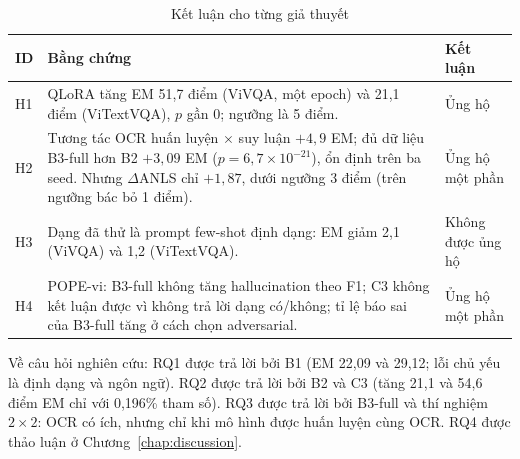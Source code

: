 \begin{table}[htbp]
\caption{Kết luận cho từng giả thuyết}
\label{tab:res-hyp}
\centering
\small
\begin{tabular}{p{}p{}p{}}
\toprule
\raggedright \textbf{ID} & \raggedright \textbf{Bằng chứng} & \raggedright \textbf{Kết luận} \tabularnewline
\midrule
\raggedright H1 & \raggedright QLoRA tăng EM 51,7 điểm (ViVQA, một epoch) và 21,1 điểm (ViTextVQA), $p$ gần 0; ngưỡng là 5 điểm. & \raggedright Ủng hộ \tabularnewline
\raggedright H2 & \raggedright Tương tác OCR huấn luyện $\times$ suy luận $+4{,}9$ EM; đủ dữ liệu B3-full hơn B2 $+3{,}09$ EM ($p = 6{,}7\times10^{-21}$), ổn định trên ba seed. Nhưng $\Delta$ANLS chỉ $+1{,}87$, dưới ngưỡng 3 điểm (trên ngưỡng bác bỏ 1 điểm). & \raggedright Ủng hộ một phần \tabularnewline
\raggedright H3 & \raggedright Dạng đã thử là prompt few-shot định dạng: EM giảm 2,1 (ViVQA) và 1,2 (ViTextVQA). & \raggedright Không được ủng hộ \tabularnewline
\raggedright H4 & \raggedright POPE-vi: B3-full không tăng hallucination theo F1; C3 không kết luận được vì không trả lời dạng có/không; tỉ lệ báo sai của B3-full tăng ở cách chọn adversarial. & \raggedright Ủng hộ một phần \tabularnewline
\bottomrule
\end{tabular}
\end{table}

Về câu hỏi nghiên cứu: RQ1 được trả lời bởi B1 (EM 22,09 và 29,12; lỗi chủ yếu là
định dạng và ngôn ngữ). RQ2 được trả lời bởi B2 và C3 (tăng 21,1 và 54,6 điểm EM
chỉ với 0,196\% tham số). RQ3 được trả lời bởi B3-full và thí nghiệm $2\times2$:
OCR có ích, nhưng chỉ khi mô hình được huấn luyện cùng OCR. RQ4 được thảo luận ở
Chương~\ref{chap:discussion}.
